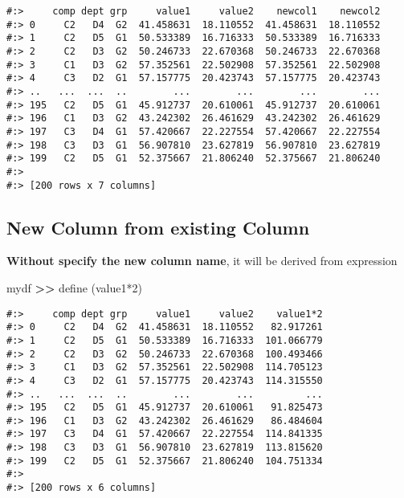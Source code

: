 \documentclass[
]{book}
\newenvironment{Shaded}{\begin{snugshade}}{\end{snugshade}}
\newcommand{\NormalTok}[1]{#1}
\newcommand{\OperatorTok}[1]{\textcolor[rgb]{0.43,0.43,0.43}{\textbf{#1}}}
\newcommand{\StringTok}[1]{\textcolor[rgb]{0.5,0.5,0.5}{#1}}
\begin{document}
\begin{verbatim}
#:>     comp dept grp     value1     value2    newcol1    newcol2
#:> 0     C2   D4  G2  41.458631  18.110552  41.458631  18.110552
#:> 1     C2   D5  G1  50.533389  16.716333  50.533389  16.716333
#:> 2     C2   D3  G2  50.246733  22.670368  50.246733  22.670368
#:> 3     C1   D3  G2  57.352561  22.502908  57.352561  22.502908
#:> 4     C3   D2  G1  57.157775  20.423743  57.157775  20.423743
#:> ..   ...  ...  ..        ...        ...        ...        ...
#:> 195   C2   D5  G1  45.912737  20.610061  45.912737  20.610061
#:> 196   C1   D3  G2  43.242302  26.461629  43.242302  26.461629
#:> 197   C3   D4  G1  57.420667  22.227554  57.420667  22.227554
#:> 198   C3   D3  G1  56.907810  23.627819  56.907810  23.627819
#:> 199   C2   D5  G1  52.375667  21.806240  52.375667  21.806240
#:> 
#:> [200 rows x 7 columns]
\end{verbatim}

\hypertarget{new-column-from-existing-column}{%
\subsection{New Column from existing Column}\label{new-column-from-existing-column}}

\textbf{Without specify the new column name}, it will be derived from expression

\begin{Shaded}
\begin{Highlighting}[]
\NormalTok{mydf }\OperatorTok{\textgreater{}\textgreater{}}\NormalTok{ define (}\StringTok{\textquotesingle{}value1*2\textquotesingle{}}\NormalTok{)}
\end{Highlighting}
\end{Shaded}

\begin{verbatim}
#:>     comp dept grp     value1     value2    value1*2
#:> 0     C2   D4  G2  41.458631  18.110552   82.917261
#:> 1     C2   D5  G1  50.533389  16.716333  101.066779
#:> 2     C2   D3  G2  50.246733  22.670368  100.493466
#:> 3     C1   D3  G2  57.352561  22.502908  114.705123
#:> 4     C3   D2  G1  57.157775  20.423743  114.315550
#:> ..   ...  ...  ..        ...        ...         ...
#:> 195   C2   D5  G1  45.912737  20.610061   91.825473
#:> 196   C1   D3  G2  43.242302  26.461629   86.484604
#:> 197   C3   D4  G1  57.420667  22.227554  114.841335
#:> 198   C3   D3  G1  56.907810  23.627819  113.815620
#:> 199   C2   D5  G1  52.375667  21.806240  104.751334
#:> 
#:> [200 rows x 6 columns]
\end{verbatim}
\end{document}

